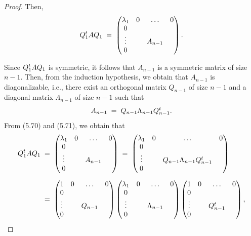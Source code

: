 \begin{proof}
Then,
\begin{equation}
Q_1^{t} AQ_1 \;=\;
\begin{pmatrix}
\lambda_1 & 0 & \dots & 0\\
0 & & & \\
\vdots & & A_{n-1} & \\
0 & & &
\end{pmatrix}.
\end{equation}

Since $Q_1^{t} AQ_1$ is symmetric, it follows that $A_{n-1}$ is a symmetric matrix of
size $n - 1$. Then, from the induction hypothesis, we obtain that $A_{n-1}$ is
diagonalizable, i.e., there exist an orthogonal matrix $Q_{n-1}$ of size $n-1$ and a
diagonal matrix $\Lambda_{n-1}$ of size $n-1$ such that
\begin{equation}
A_{n-1} \;=\; Q_{n-1}\Lambda_{n-1}Q_{n-1}^{t}.
\end{equation}
From (5.70) and (5.71), we obtain that
\[
\begin{aligned}
Q_1\tp AQ_1 \;&=\;
\begin{pmatrix}
\lambda_1 & 0 & \dots & 0\\
0 & & & \\
\vdots & & A_{n-1} & \\
0 & & &
\end{pmatrix}
\;=\;
\begin{pmatrix}
\lambda_1 & 0 & \dots & 0\\
0 & & & \\
\vdots & & Q_{n-1}\Lambda_{n-1}Q_{n-1}\tp & \\
0 & & &
\end{pmatrix}\\[6pt]
&=\;
\begin{pmatrix}
1 & 0 & \dots & 0\\
0 & & & \\
\vdots & & Q_{n-1} & \\
0 & & &
\end{pmatrix}
\begin{pmatrix}
\lambda_1 & 0 & \dots & 0\\
0 & & & \\
\vdots & & \Lambda_{n-1} & \\
0 & & &
\end{pmatrix}
\begin{pmatrix}
1 & 0 & \dots & 0\\
0 & & & \\
\vdots & & Q_{n-1}\tp & \\
0 & & &
\end{pmatrix},

\end{aligned}\]
\end{proof}
